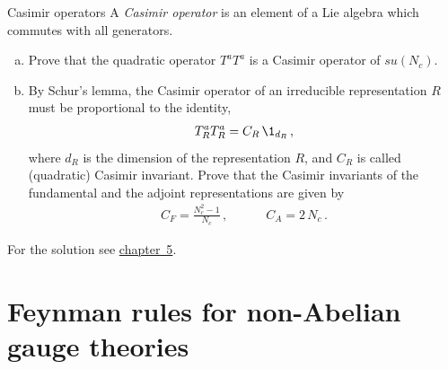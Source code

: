  
 \begin{exer}{Casimir operators}
\label{Ex:1.4}
A \emph{Casimir operator} is an element of a Lie algebra which commutes with all generators.
\begin{enumerate}[a)]
\item Prove that the quadratic operator $T^a T^a$ is a Casimir operator of $su(N_c)$.
\item By Schur's lemma, the Casimir operator of an irreducible representation $R$ must be proportional to the identity,
\begin{align}
T^a_R T^a_R = C_R \, \1_{d_R} \,,
\end{align}
where $d_R$ is the dimension of the representation $R$, and $C_R$ is called (quadratic) Casimir invariant. Prove that the Casimir invariants of the fundamental and the adjoint representations are given by
\begin{align}
C_F = \frac{N_c^2-1}{N_c} \,, \qquad \quad C_A = 2 \, N_c \,.
\end{align}
\end{enumerate}
For the solution see \hyperref[Sol:1.4]{chapter~5}.
\end{exer}

 
 
 
 \section{Feynman rules for non-Abelian gauge theories}
 \label{chap:1.4}


